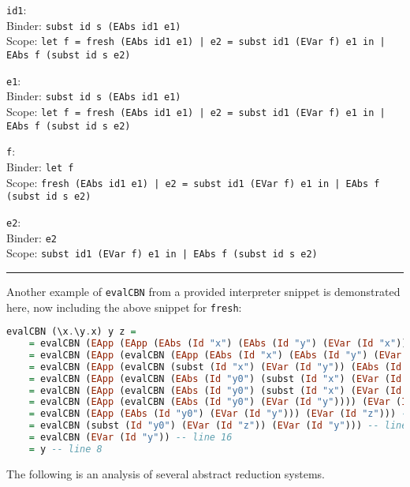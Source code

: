 \documentclass{article}
\theoremstyle{theorem}
\theoremstyle{definition}
\theoremstyle{remark}
\begin{document}
\noindent \texttt{id1}:\\
Binder: \texttt{subst id s (EAbs id1 e1)}\\
Scope: \texttt{let f = fresh (EAbs id1 e1) | e2 = subst id1 (EVar f) e1 in | EAbs f (subst id s e2)}

\noindent \texttt{e1}:\\
Binder: \texttt{subst id s (EAbs id1 e1)}\\
Scope: \texttt{let f = fresh (EAbs id1 e1) | e2 = subst id1 (EVar f) e1 in | EAbs f (subst id s e2)}

\noindent \texttt{f}:\\
Binder: \texttt{let f}\\
Scope: \texttt{fresh (EAbs id1 e1) | e2 = subst id1 (EVar f) e1 in | EAbs f (subst id s e2)}

\noindent \texttt{e2}:\\
Binder: \texttt{e2}\\
Scope: \texttt{subst id1 (EVar f) e1 in | EAbs f (subst id s e2)}

\noindent\rule{\textwidth}{1pt}

\noindent Another example of \texttt{evalCBN} from a provided interpreter snippet is demonstrated here, now including the above snippet for \texttt{fresh}:

\begin{lstlisting}[language=Haskell]
evalCBN (\x.\y.x) y z =
    = evalCBN (EApp (EApp (EAbs (Id "x") (EAbs (Id "y") (EVar (Id "x")))) (EVar (Id "y"))) (EVar (Id "z"))) -- converted to concrete format
    = evalCBN (EApp (evalCBN (EApp (EAbs (Id "x") (EAbs (Id "y") (EVar (Id "x")))) (EVar (Id "y")))) (EVar (Id "z"))) -- line 5
    = evalCBN (EApp (evalCBN (subst (Id "x") (EVar (Id "y")) (EAbs (Id "y") (EVar (Id "x"))))) (EVar (Id "z"))) -- line 6
    = evalCBN (EApp (evalCBN (EAbs (Id "y0") (subst (Id "x") (EVar (Id "y")) (subst (Id "y") (EVar (Id "y0")) (EVar (Id "x")))))) (EVar (Id "z"))) -- line 22
    = evalCBN (EApp (evalCBN (EAbs (Id "y0") (subst (Id "x") (EVar (Id "y")) (EVar (Id "x"))))) (EVar (Id "z"))) -- line 16
    = evalCBN (EApp (evalCBN (EAbs (Id "y0") (EVar (Id "y")))) (EVar (Id "z"))) -- line 15
    = evalCBN (EApp (EAbs (Id "y0") (EVar (Id "y"))) (EVar (Id "z"))) -- line 8
    = evalCBN (subst (Id "y0") (EVar (Id "z")) (EVar (Id "y"))) -- line 6
    = evalCBN (EVar (Id "y")) -- line 16
    = y -- line 8
\end{lstlisting}

\newpage 

The following is an analysis of several abstract reduction systems.
\end{document}
